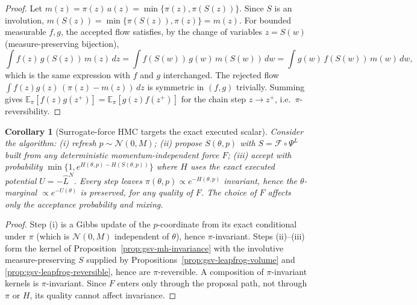 \documentclass[11pt]{article}
\newtheorem{corollary}[proposition]{Corollary}
\theoremstyle{definition}
\theoremstyle{remark}
\begin{document}
\begin{proof}
Let $m(z)=\pi(z)\,a(z)=\min\{\pi(z),\pi(S(z))\}$.  Since $S$ is an
involution, $m(S(z))=\min\{\pi(S(z)),\pi(z)\}=m(z)$.  For bounded measurable
$f,g$, the accepted flow satisfies, by the change of variables $z=S(w)$
(measure-preserving bijection),
\begin{equation}
\label{eq:gsv-detailed-balance}
 \int f(z)\,g(S(z))\,m(z)\,dz
 =\int f(S(w))\,g(w)\,m(S(w))\,dw
 =\int g(w)\,f(S(w))\,m(w)\,dw ,
\end{equation}
which is the same expression with $f$ and $g$ interchanged.  The rejected
flow $\int f(z)g(z)\,(\pi(z)-m(z))\,dz$ is symmetric in $(f,g)$ trivially.
Summing gives
$\mathbb{E}_{\pi}[f(z)g(z^{+})]=\mathbb{E}_{\pi}[g(z)f(z^{+})]$ for the
chain step $z\to z^{+}$, i.e.\ $\pi$-reversibility.
\end{proof}

\begin{corollary}[Surrogate-force HMC targets the exact executed scalar]
\label{cor:gsv-surrogate-force}
Consider the algorithm: (i) refresh $p\sim\mathcal N(0,M)$; (ii) propose
$S(\theta,p)$ with $S=\mathcal F\circ\Psi^{L}$ built from \emph{any}
deterministic momentum-independent force $F$; (iii) accept with probability
$\min\{1,e^{H(\theta,p)-H(S(\theta,p))}\}$ where $H$ uses the exact executed
potential $U=-\widehat L^{N}$.  Every step leaves
$\pi(\theta,p)\propto e^{-H(\theta,p)}$ invariant, hence the $\theta$-marginal
$\propto e^{-U(\theta)}$ is preserved, for any quality of $F$.  The choice of
$F$ affects only the acceptance probability and mixing.
\end{corollary}

\begin{proof}
Step (i) is a Gibbs update of the $p$-coordinate from its exact conditional
under $\pi$ (which is $\mathcal N(0,M)$ independent of $\theta$), hence
$\pi$-invariant.  Steps (ii)--(iii) form the kernel of
Proposition~\ref{prop:gsv-mh-invariance} with the involutive
measure-preserving $S$ supplied by
Propositions~\ref{prop:gsv-leapfrog-volume} and
\ref{prop:gsv-leapfrog-reversible}, hence are $\pi$-reversible.  A
composition of $\pi$-invariant kernels is $\pi$-invariant.  Since $F$ enters
only through the proposal path, not through $\pi$ or $H$, its quality cannot
affect invariance.
\end{proof}
\end{document}
